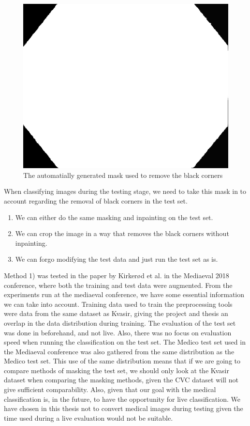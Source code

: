 \begin{figure}[h]
\centering
\includegraphics[scale=0.3]{experiments/figures/default-corner.png}
\caption{The automatially generated mask used to remove the black corners}
\label{fig:corner_mask}
\end{figure}

When classifying images during the testing stage, we need to take this mask in to account regarding the removal of black corners in the test set.
\begin{enumerate}
\item We can either do the same masking and inpainting on the test set. 
\item We can crop the image in a way that removes the black corners without inpainting.
\item We can forgo modifying the test data and just run the test set as is. 
\end{enumerate}

Method 1)  was tested in the paper by Kirkerød et al. in the Mediaeval 2018 conference, where both the training and test data were augmented.
From the experiments run at the mediaeval conference, we have some essential information we can take into account.  
Training data used to train the preprocessing tools were data from the same dataset as Kvasir, giving the project and thesis an overlap in the data distribution during training. 
The evaluation of the test set was done in beforehand, and not live. Also, there was no focus on evaluation speed when running the classification on the test set. The Medico test set used in the Mediaeval conference was also gathered from the same distribution as the Medico test set. This use of the same distribution means that if we are going to compare methods of masking the test set, we should only look at the Kvasir dataset when comparing the masking methods, given the CVC dataset will not give sufficient comparability.
Also, given that our goal with the medical classification is, in the future, to have the opportunity for live classification. We have chosen in this thesis not to convert medical images during testing given the time used during a live evaluation would not be suitable. 


